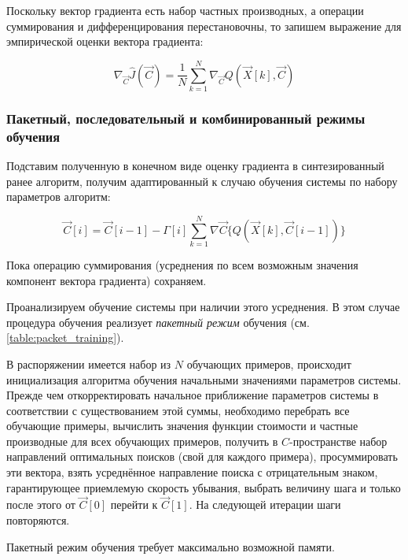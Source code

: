 \documentclass[a4paper]{article}
\numberwithin{equation}{subsection}
\begin{document}
Поскольку вектор градиента есть набор частных производных, а операции суммирования 
и дифференцирования перестановочны, то запишем выражение для эмпирической оценки вектора
градиента:

\begin{equation}
    \nabla_{\vec{C}} {\hat{J}(\vec{C})} = \dfrac{1}{N} \sum_{k=1}^{N} \nabla_{\vec{C}}{Q(\vec{X}[k], \vec{C})}
\end{equation}




\subsubsection{Пакетный, последовательный и комбинированный режимы обучения}

Подставим полученную в конечном виде оценку градиента в синтезированный ранее алгоритм,
получим адаптированный к случаю обучения системы по набору параметров алгоритм:

\begin{equation}
    \vec{C}[i] = \vec{C}[i-1] - \Gamma[i] \sum_{k=1}^{N} \nabla\vec{C} \{ Q(\vec{X}[k], \vec{C}[i-1]) \}
\end{equation}

Пока операцию суммирования (усреднения по всем возможным значения компонент вектора 
градиента) сохраняем.

Проанализируем обучение системы при наличии этого усреднения. В этом случае процедура 
обучения реализует \textit{пакетный режим} обучения (см. \ref{table:packet_training}).

В распоряжении имеется набор из $N$ обучающих примеров, происходит инициализация алгоритма
обучения начальными значениями параметров системы. Прежде чем откорректировать начальное
приближение параметров системы в соответствии с существованием этой суммы, необходимо
перебрать все обучающие примеры, вычислить значения функции стоимости и частные 
производные для всех обучающих примеров, получить в $C$-пространстве набор направлений
оптимальных поисков (свой для каждого примера), просуммировать эти вектора, взять 
усреднённое направление поиска с отрицательным знаком, гарантирующее приемлемую скорость
убывания, выбрать величину шага и только после этого от $\vec{C}[0]$ перейти к $\vec{C}[1]$.
На следующей итерации шаги повторяются.

Пакетный режим обучения требует максимально возможной памяти.
\end{document}
